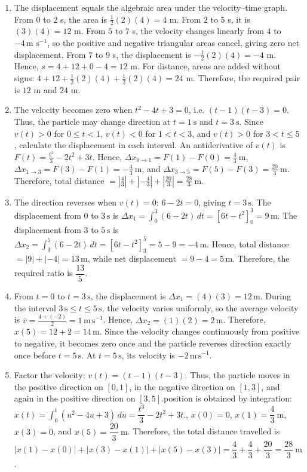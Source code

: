 \documentclass[11pt,a4paper]{article}
\begin{document}
\begin{enumerate}
\item The displacement equals the algebraic area under the velocity–time graph. From $0$ to $2$ s, the area is $\frac12(2)(4)=4$ m. From $2$ to $5$ s, it is $(3)(4)=12$ m. From $5$ to $7$ s, the velocity changes linearly from $4$ to $-4\,\text{m s}^{-1}$, so the positive and negative triangular areas cancel, giving zero net displacement. From $7$ to $9$ s, the displacement is $-\frac12(2)(4)=-4$ m. Hence, $s=4+12+0-4=12$ m. For distance, areas are added without signs: $4+12+\frac12(2)(4)+\frac12(2)(4)=24$ m. Therefore, the required pair is $12$ m and $24$ m.
\item The velocity becomes zero when $t^2-4t+3=0$, i.e. $(t-1)(t-3)=0$. Thus, the particle may change direction at $t=1\ \text{s}$ and $t=3\ \text{s}$. Since $v(t)>0$ for $0\le t<1$, $v(t)<0$ for $1<t<3$, and $v(t)>0$ for $3<t\le5$, calculate the displacement in each interval. An antiderivative of $v(t)$ is $F(t)=\frac{t^3}{3}-2t^2+3t$. Hence, $\Delta x_{0\to1}=F(1)-F(0)=\frac{4}{3}\ \text{m}$, $\Delta x_{1\to3}=F(3)-F(1)=-\frac{4}{3}\ \text{m}$, and $\Delta x_{3\to5}=F(5)-F(3)=\frac{20}{3}\ \text{m}$. Therefore, total distance $=\left|\frac{4}{3}\right|+\left|-\frac{4}{3}\right|+\left|\frac{20}{3}\right|=\frac{28}{3}\ \text{m}$.
\item The direction reverses when $v(t)=0$: $6-2t=0$, giving $t=3\,\mathrm{s}$. The displacement from $0$ to $3\,\mathrm{s}$ is $\Delta x_1=\int_0^3(6-2t)\,dt=[6t-t^2]_0^3=9\,\mathrm{m}$. The displacement from $3$ to $5\,\mathrm{s}$ is $\Delta x_2=\int_3^5(6-2t)\,dt=[6t-t^2]_3^5=5-9=-4\,\mathrm{m}$. Hence, total distance $=|9|+|-4|=13\,\mathrm{m}$, while net displacement $=9-4=5\,\mathrm{m}$. Therefore, the required ratio is $\dfrac{13}{5}$.
\item From $t=0$ to $t=3\,\mathrm{s}$, the displacement is $\Delta x_1=(4)(3)=12\,\mathrm{m}$. During the interval $3\,\mathrm{s}\le t\le5\,\mathrm{s}$, the velocity varies uniformly, so the average velocity is $\bar v=\frac{4+(-2)}{2}=1\,\mathrm{m\,s^{-1}}$. Hence, $\Delta x_2=(1)(2)=2\,\mathrm{m}$. Therefore, $x(5)=12+2=14\,\mathrm{m}$. Since the velocity changes continuously from positive to negative, it becomes zero once and the particle reverses direction exactly once before $t=5\,\mathrm{s}$. At $t=5\,\mathrm{s}$, its velocity is $-2\,\mathrm{m\,s^{-1}}$.
\item Factor the velocity: $v(t)=(t-1)(t-3)$. Thus, the particle moves in the positive direction on $[0,1]$, in the negative direction on $[1,3]$, and again in the positive direction on $[3,5]$.\n\nThe position is obtained by integration:\n\n$x(t)=\int_0^t (u^2-4u+3)\,du=\dfrac{t^3}{3}-2t^2+3t$.\n\nHence, $x(0)=0$, $x(1)=\dfrac{4}{3}\ \mathrm{m}$, $x(3)=0$, and $x(5)=\dfrac{20}{3}\ \mathrm{m}$. Therefore, the total distance travelled is\n\n$|x(1)-x(0)|+|x(3)-x(1)|+|x(5)-x(3)|=\dfrac{4}{3}+\dfrac{4}{3}+\dfrac{20}{3}=\dfrac{28}{3}\ \mathrm{m}$.

\end{enumerate}
\end{document}
